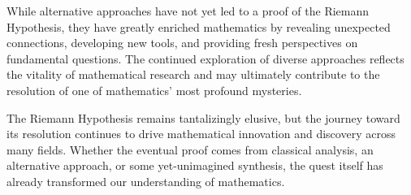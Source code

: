 \begin{conclusion}
While alternative approaches have not yet led to a proof of the Riemann Hypothesis, they have greatly enriched mathematics by revealing unexpected connections, developing new tools, and providing fresh perspectives on fundamental questions. The continued exploration of diverse approaches reflects the vitality of mathematical research and may ultimately contribute to the resolution of one of mathematics' most profound mysteries.

The Riemann Hypothesis remains tantalizingly elusive, but the journey toward its resolution continues to drive mathematical innovation and discovery across many fields. Whether the eventual proof comes from classical analysis, an alternative approach, or some yet-unimagined synthesis, the quest itself has already transformed our understanding of mathematics.
\end{conclusion}